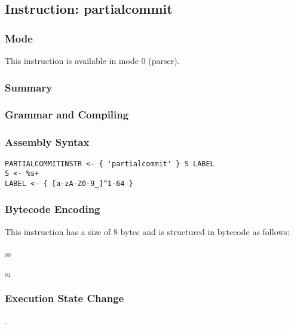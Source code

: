 \subsection{Instruction: partialcommit}

\subsubsection{Mode}
This instruction is available in mode 0 (parser).
\subsubsection{Summary}


\subsubsection{Grammar and Compiling}


\subsubsection{Assembly Syntax}

\begin{myquote}
\begin{verbatim}
PARTIALCOMMITINSTR <- { 'partialcommit' } S LABEL
S <- %s+
LABEL <- { [a-zA-Z0-9_]^1-64 }
\end{verbatim}
\end{myquote}

\subsubsection{Bytecode Encoding}

This instruction has a size of 8 bytes and is structured in bytecode as follows:

$_{00}$\ 



$_{04}$\ 

\subsubsection{Execution State Change}

.


